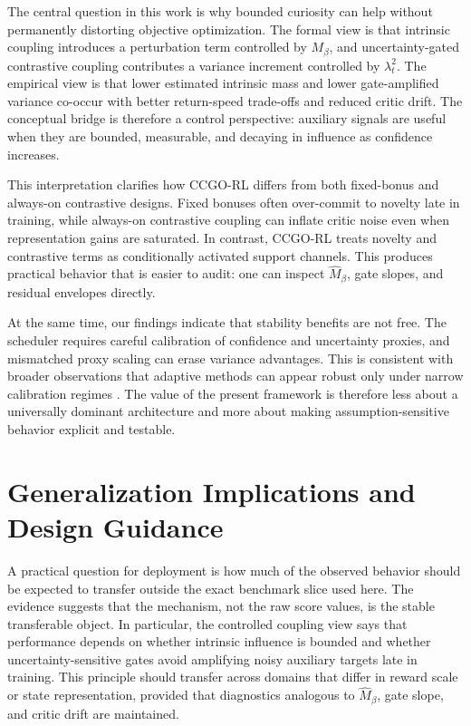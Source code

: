 \documentclass{article} %
\begin{document}
The central question in this work is why bounded curiosity can help without permanently distorting objective optimization. The formal view is that intrinsic coupling introduces a perturbation term controlled by $M_\beta$, and uncertainty-gated contrastive coupling contributes a variance increment controlled by $\lambda_t^2$. The empirical view is that lower estimated intrinsic mass and lower gate-amplified variance co-occur with better return-speed trade-offs and reduced critic drift. The conceptual bridge is therefore a control perspective: auxiliary signals are useful when they are bounded, measurable, and decaying in influence as confidence increases.

This interpretation clarifies how CCGO-RL differs from both fixed-bonus and always-on contrastive designs. Fixed bonuses often over-commit to novelty late in training, while always-on contrastive coupling can inflate critic noise even when representation gains are saturated. In contrast, CCGO-RL treats novelty and contrastive terms as conditionally activated support channels. This produces practical behavior that is easier to audit: one can inspect $\widehat{M}_\beta$, gate slopes, and residual envelopes directly.

At the same time, our findings indicate that stability benefits are not free. The scheduler requires careful calibration of confidence and uncertainty proxies, and mismatched proxy scaling can erase variance advantages. This is consistent with broader observations that adaptive methods can appear robust only under narrow calibration regimes \citep{arxiv2602_24081, arxiv2603_02104, arxiv2603_14887}. The value of the present framework is therefore less about a universally dominant architecture and more about making assumption-sensitive behavior explicit and testable.

\section{Generalization Implications and Design Guidance}
\label{sec:implications}

A practical question for deployment is how much of the observed behavior should be expected to transfer outside the exact benchmark slice used here. The evidence suggests that the mechanism, not the raw score values, is the stable transferable object. In particular, the controlled coupling view says that performance depends on whether intrinsic influence is bounded and whether uncertainty-sensitive gates avoid amplifying noisy auxiliary targets late in training. This principle should transfer across domains that differ in reward scale or state representation, provided that diagnostics analogous to $\widehat{M}_\beta$, gate slope, and critic drift are maintained.
\end{document}
